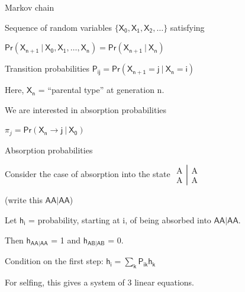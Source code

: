 \documentclass[aspectratio=169,12pt,t]{beamer}
\begin{document}
\begin{frame}[c]{Markov chain}

\bbi
\item Sequence of random variables $\mathsf{\{X_0, X_1, X_2, \dots\}}$
  satisfying

\vspace{2mm}

\centerline{\hilit $\mathsf{Pr(X_{n+1} \ | \ X_0,
X_1, \dots, X_n) = Pr(X_{n+1} \ | \ X_n)}$}

\item Transition probabilities {\hilit $\mathsf{P_{ij} =
  Pr(X_{n+1} = j \ | \ X_n = i)}$}

\item Here, $\mathsf{X_n}$ = ``parental type'' at generation n.

\item We are interested in {\vhilit absorption probabilities}

\vspace{2mm}

\centerline{\hilit $\pi_j = \mathsf{Pr(X_n \rightarrow j \ | \ X_0)}$}
\ei

\end{frame}



\begin{frame}[c]{Absorption probabilities}

  \bbi

  \item[] Consider the case of {\vhilit absorption} into the state
$\left.\begin{array}{c} \text{A} \\ \text{A} \end{array} \right| \begin{array}{c} \text{A}
  \\ \text{A} \end{array} $

\hspace*{15mm} {\hilit (write this $\mathsf{AA|AA}$)}

\item[] Let $\mathsf{h_i}$ = probability, starting at i, of being absorbed into $\mathsf{AA|AA}$.

\item[] Then {\hilit $\mathsf{h_{AA|AA}}$ = 1} and
{\hilit $\mathsf{h_{AB|AB}}$ = 0}.

\item[] {\vhilit Condition on the first step:} \hspace*{10mm}
{\hilit
$\mathsf{h_i  = \sum_k  P_{ik} h_k}$}

\item[] For selfing, this gives a system of 3 linear equations.
\ei

\end{frame}
\end{document}

